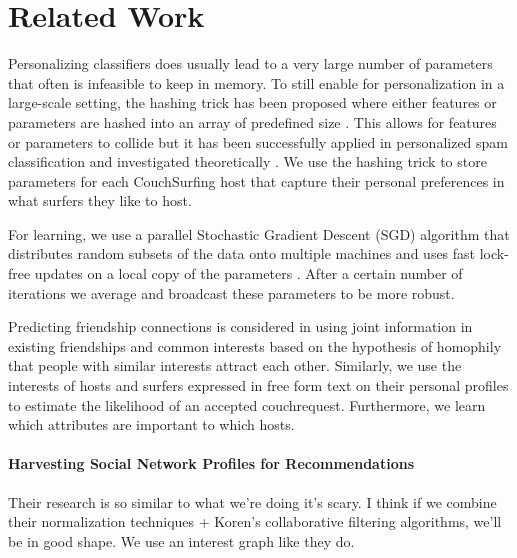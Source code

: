 \section{Related Work}


Personalizing classifiers does usually lead to a very large number of parameters that often is infeasible to keep in memory. To still enable for personalization in a large-scale setting, the hashing trick has been proposed where either features or parameters are hashed into an array of predefined size \cite{Attenberg2009,Weinberger2012}. This allows for features or parameters to collide but it has been successfully applied in personalized spam classification \cite{Attenberg2009} and investigated theoretically \cite{Weinberger2012}. We use the hashing trick to store parameters for each CouchSurfing host that capture their personal preferences in what surfers they like to host.

For learning, we use a parallel Stochastic Gradient Descent (SGD) algorithm that distributes random subsets of the data onto multiple machines and uses fast lock-free updates on a local copy of the parameters \cite{Zinkevich2010}. After a certain number of iterations we average and broadcast these parameters to be more robust.

Predicting friendship connections is considered in \cite{Yang2011} using joint information in existing friendships and common interests based on the hypothesis of homophily that people with similar interests attract each other. Similarly, we use the interests of hosts and surfers expressed in free form text on their personal profiles to estimate the likelihood of an accepted couchrequest. Furthermore, we learn which attributes are important to which hosts.



\paragraph{Harvesting Social Network Profiles for Recommendations} \cite{Liu2005}
Their research is so similar to what we're doing it's scary.
I think if we combine their normalization techniques + Koren's collaborative filtering algorithms, we'll be in good shape.
We use an interest graph like they do. 

